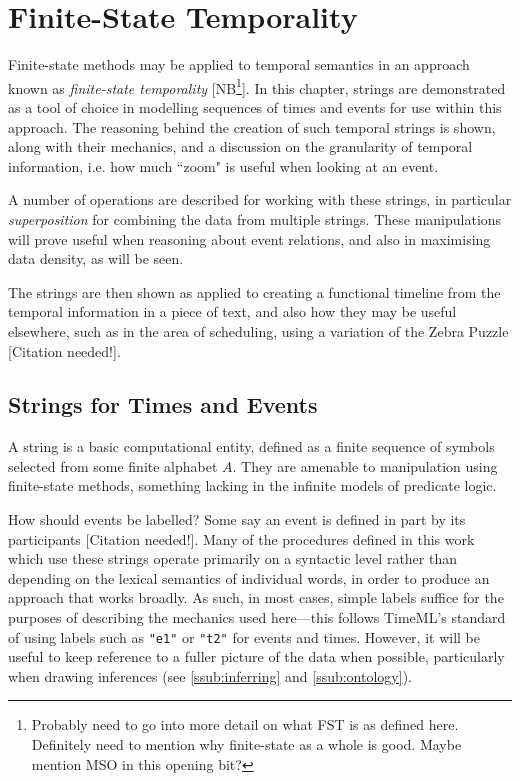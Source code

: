 \documentclass[a4paper,12pt,leqno]{article}
\newcommand{\citeneeded}[1][]{{\color{red}[Citation needed!#1]}}
\newcommand{\selfnote}[1]{{\color{red}[NB\footnote{{\color{red}#1}}]}}
\begin{document}
\newpage
\section{Finite-State Temporality}\label{sec:fst}
Finite-state methods may be applied to temporal semantics in an approach known as \textit{finite-state temporality} \citep{fernando2005entailments} \selfnote{Probably need to go into more detail on what FST is as defined here. Definitely need to mention why finite-state as a whole is good. Maybe mention MSO in this opening bit?}. In this chapter, strings are demonstrated as a tool of choice in modelling sequences of times and events for use within this approach. The reasoning behind the creation of such temporal strings is shown, along with their mechanics, and a discussion on the granularity of temporal information, i.e. how much ``zoom" is useful when looking at an event.

A number of operations are described for working with these strings, in particular \textit{superposition} for combining the data from multiple strings. These manipulations will prove useful when reasoning about event relations, and also in maximising data density, as will be seen.

The strings are then shown as applied to creating a functional timeline from the temporal information in a piece of text, and also how they may be useful elsewhere, such as in the area of scheduling, using a variation of the Zebra Puzzle \citeneeded{}.

\subsection{Strings for Times and Events}\label{sub:strings}
A string is a basic computational entity, defined as a finite sequence of symbols selected from some finite alphabet $A$. They are amenable to manipulation using finite-state methods, something lacking in the infinite models of predicate logic.

How should events be labelled? Some say an event is defined in part by its participants \citeneeded{}. Many of the procedures defined in this work which use these strings operate primarily on a syntactic level rather than depending on the lexical semantics of individual words, in order to produce an approach that works broadly. As such, in most cases, simple labels suffice for the purposes of describing the mechanics used here---this follows TimeML's standard of using labels such as \texttt{"e1"} or \texttt{"t2"} for events and times. However, it will be useful to keep reference to a fuller picture of the data when possible, particularly when drawing inferences (see \ref{ssub:inferring} and \ref{ssub:ontology}).
\end{document}
